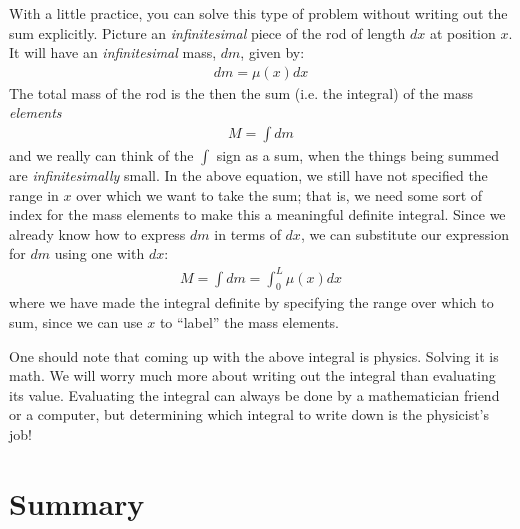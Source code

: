 With a little practice, you can solve this type of problem without writing out the sum explicitly. Picture an \textit{infinitesimal} piece of the rod of length $dx$ at position $x$. It will have an \textit{infinitesimal} mass, $dm$, given by:
\begin{align*}
dm = \mu(x) dx
\end{align*}
The total mass of the rod is the then the sum (i.e. the integral) of the mass \textit{elements}
\begin{align*}
M = \int dm
\end{align*}
and we really can think of the $\int$ sign as a sum, when the things being summed are \textit{infinitesimally} small. In the above equation, we still have not specified the range in $x$ over which we want to take the sum; that is, we need some sort of index for the mass elements to make this a meaningful definite integral. Since we already know how to express $dm$ in terms of $dx$, we can substitute our expression for $dm$ using one with $dx$:
\begin{align*}
M = \int dm = \int_0^L \mu(x) dx
\end{align*}
where we have made the integral definite by specifying the range over which to sum, since we can use $x$ to ``label'' the mass elements.

One should note that coming up with the above integral is physics. Solving it is math. We will worry much more about writing out the integral than evaluating its value. Evaluating the integral can always be done by a mathematician friend or a computer, but determining which integral to write down is the physicist's job!

\newpage
\section{Summary}
\vspace{0.5cm}

